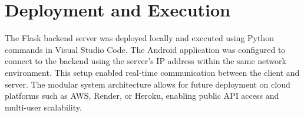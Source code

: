 \section{Deployment and Execution} \label{S6.9}

The Flask backend server was deployed locally and executed using Python commands in Visual Studio Code. The Android application was configured to connect to the backend using the server’s IP address within the same network environment. This setup enabled real-time communication between the client and server. The modular system architecture allows for future deployment on cloud platforms such as AWS, Render, or Heroku, enabling public API access and multi-user scalability.
